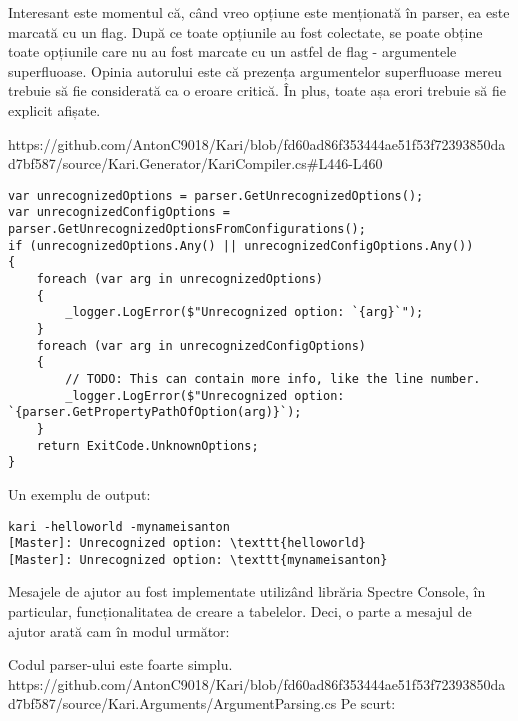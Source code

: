 \documentclass{report}
\begin{document}
Interesant este momentul că, când vreo opțiune este menționată în parser, ea este marcată cu un flag.
După ce toate opțiunile au fost colectate, se poate obține toate opțiunile care nu au fost marcate cu un astfel de flag - argumentele superfluoase.
Opinia autorului este că prezența argumentelor superfluoase mereu trebuie să fie considerată ca o eroare critică.
În plus, toate așa erori trebuie să fie explicit afișate.

https://github.com/AntonC9018/Kari/blob/fd60ad86f353444ae51f53f72393850dad7bf587/source/Kari.Generator/KariCompiler.cs#L446-L460

\begin{lstlisting}
var unrecognizedOptions = parser.GetUnrecognizedOptions();
var unrecognizedConfigOptions = parser.GetUnrecognizedOptionsFromConfigurations();
if (unrecognizedOptions.Any() || unrecognizedConfigOptions.Any())
{
    foreach (var arg in unrecognizedOptions)
    {
        _logger.LogError($"Unrecognized option: `{arg}`");
    }
    foreach (var arg in unrecognizedConfigOptions)
    {
        // TODO: This can contain more info, like the line number.
        _logger.LogError($"Unrecognized option: `{parser.GetPropertyPathOfOption(arg)}`);
    }
    return ExitCode.UnknownOptions;
}
\end{lstlisting}

Un exemplu de output:

\begin{verbatim}
kari -helloworld -mynameisanton
[Master]: Unrecognized option: \texttt{helloworld}
[Master]: Unrecognized option: \texttt{mynameisanton}
\end{verbatim}


Mesajele de ajutor au fost implementate utilizând librăria Spectre Console\cite{spectre_console_github}, în particular, funcționalitatea de creare a tabelelor.
Deci, o parte a mesajul de ajutor arată cam în modul următor:

Codul parser-ului este foarte simplu.
https://github.com/AntonC9018/Kari/blob/fd60ad86f353444ae51f53f72393850dad7bf587/source/Kari.Arguments/ArgumentParsing.cs
Pe scurt:
\end{document}
